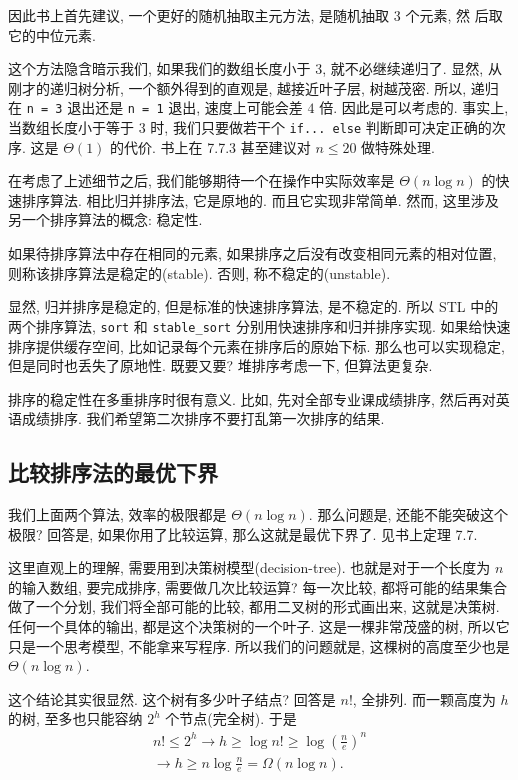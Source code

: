 \documentclass[a4paper]{ctexart}
\theoremstyle{definition}
\theoremstyle{definition}
\begin{document}
因此书上首先建议, 一个更好的随机抽取主元方法, 是随机抽取 3 个元素, 然
后取它的中位元素. 

这个方法隐含暗示我们, 如果我们的数组长度小于 3, 就不必继续递归了. 显然,
从刚才的递归树分析, 一个额外得到的直观是, 越接近叶子层, 树越茂密. 所以,
递归在 \verb|n = 3| 退出还是 \verb|n = 1| 退出, 速度上可能会差 $4$ 倍.
因此是可以考虑的. 事实上, 当数组长度小于等于 $3$ 时, 我们只要做若干个\newline
\verb|if... else| 判断即可决定正确的次序. 这是 $\Theta(1)$ 的代价.
书上在 7.7.3 甚至建议对 $n \leq 20$ 做特殊处理.

在考虑了上述细节之后, 我们能够期待一个在操作中实际效率是
$\Theta(n\log n)$ 的快速排序算法. 相比归并排序法, 它是原地的.
而且它实现非常简单. 然而, 这里涉及另一个排序算法的概念: 稳定性. 

 如果待排序算法中存在相同的元素,
如果排序之后没有改变相同元素的相对位置, 则称该排序算法是稳定的(stable).
否则, 称不稳定的(unstable).

显然, 归并排序是稳定的, 但是标准的快速排序算法, 是不稳定的.
所以 STL 中的两个排序算法, \verb|sort| 和 \verb|stable_sort|
分别用快速排序和归并排序实现. 如果给快速排序提供缓存空间,
比如记录每个元素在排序后的原始下标. 那么也可以实现稳定,
但是同时也丢失了原地性. 既要又要? 堆排序考虑一下, 但算法更复杂. 

排序的稳定性在多重排序时很有意义. 比如, 先对全部专业课成绩排序,
然后再对英语成绩排序. 我们希望第二次排序不要打乱第一次排序的结果. 

\subsection{比较排序法的最优下界}
我们上面两个算法, 效率的极限都是 $\Theta(n \log n)$. 那么问题是,
还能不能突破这个极限? 回答是, 如果你用了比较运算, 那么这就是最优下界了.
见书上定理 7.7.

这里直观上的理解, 需要用到决策树模型(decision-tree).
也就是对于一个长度为 $n$ 的输入数组, 要完成排序, 需要做几次比较运算?
每一次比较, 都将可能的结果集合做了一个分划, 我们将全部可能的比较,
都用二叉树的形式画出来, 这就是决策树. 任何一个具体的输出, 都是这个决策树的一个叶子.
这是一棵非常茂盛的树, 所以它只是一个思考模型, 不能拿来写程序.
所以我们的问题就是, 这棵树的高度至少也是 $\Theta(n \log n)$.

这个结论其实很显然. 这个树有多少叶子结点? 回答是 $n!$, 全排列.
而一颗高度为 $h$ 的树, 至多也只能容纳 $2^h$ 个节点(完全树).
于是
$$
\begin{array}{r}
n! \leq 2^h \rightarrow h \geq \log n! \geq
\log\left(\frac{n}{e}\right)^n \\ \rightarrow h \geq n \log \frac{n}{e}
= \Omega(n\log n).
\end{array}
$$
\end{document}

